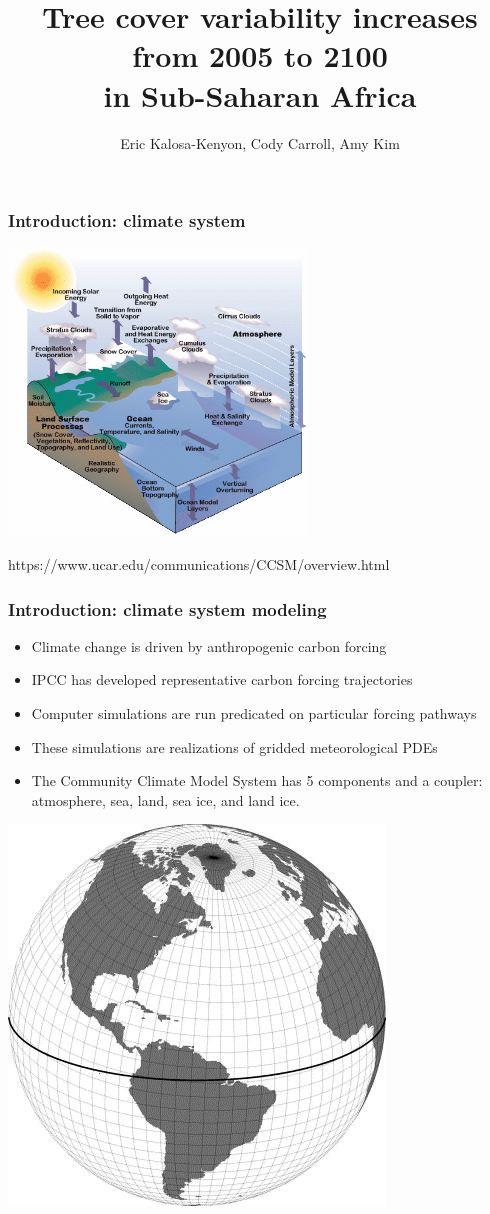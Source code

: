 \documentclass{beamer}
\title{Tree cover variability increases from 2005 to 2100\\ in Sub-Saharan Africa}
\author{Eric Kalosa-Kenyon, Cody Carroll, Amy Kim}
\institute{University of California, Davis}
\date{}
\begin{document}
	
	\frame{\titlepage}
	
\begin{frame}
	\frametitle{Introduction: climate system}
	\includegraphics[height=3in]{../img/ccsm_diagram_picture.jpeg}
	
	https://www.ucar.edu/communications/CCSM/overview.html
\end{frame}

\begin{frame}
\frametitle{Introduction: climate system modeling}
\begin{itemize}
	\item Climate change is driven by anthropogenic carbon forcing
	\item IPCC has developed representative carbon forcing trajectories
	\item Computer simulations are run predicated on particular forcing
	pathways
	\item These simulations are realizations of gridded meteorological PDEs
	\item The Community Climate Model System has 5 components and a coupler:
	atmosphere, sea, land, sea ice, and land ice.
\end{itemize}
\includegraphics[width=\textwidth/2]{../img/greenland_pole_grid.jpg}
\end{frame}
\end{document}
